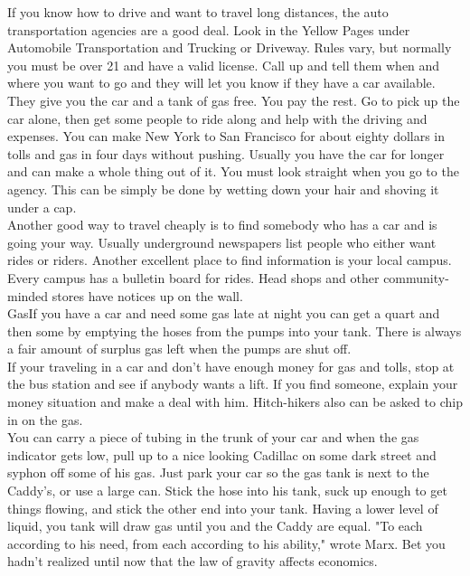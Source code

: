 \documentclass[11pt,twoside,a4paper]{book}
\begin{document}
If you know how to drive and want to travel long distances, the auto transportation agencies are a good deal. Look in the Yellow Pages under Automobile Transportation and Trucking or Driveway. Rules vary, but normally you must be over 21 and have a valid license. Call up and tell them when and where you want to go and they will let you know if they have a car available. They give you the car and a tank of gas free. You pay the rest. Go to pick up the car alone, then get some people to ride along and help with the driving and expenses. You can make New York to San Francisco for about eighty dollars in tolls and gas in four days without pushing. Usually you have the car for longer and can make a whole thing out of it. You must look straight when you go to the agency. This can be simply be done by wetting down your hair and shoving it under a cap.~\\

Another good way to travel cheaply is to find somebody who has a car and is going your way.  Usually underground newspapers list people who either want rides or riders. Another excellent place to find information is your local campus. Every campus has a bulletin board for rides. Head shops and other community-minded stores have notices up on the wall.~\\

GasIf you have a car and need some gas late at night you can get a quart and then some by emptying the hoses from the pumps into your tank. There is always a fair amount of surplus gas left when the pumps are shut off.~\\

If your traveling in a car and don't have enough money for gas and tolls, stop at the bus station and see if anybody wants a lift. If you find someone, explain your money situation and make a deal with him. Hitch-hikers also can be asked to chip in on the gas.~\\

You can carry a piece of tubing in the trunk of your car and when the gas indicator gets low, pull up to a nice looking Cadillac on some dark street and syphon off some of his gas. Just park your car so the gas tank is next to the Caddy's, or use a large can. Stick the hose into his tank, suck up enough to get things flowing, and stick the other end into your tank. Having a lower level of liquid, you tank will draw gas until you and the Caddy are equal. "To each according to his need, from each according to his ability," wrote Marx. Bet you hadn't realized until now that the law of gravity affects economics.~\\
\end{document}
